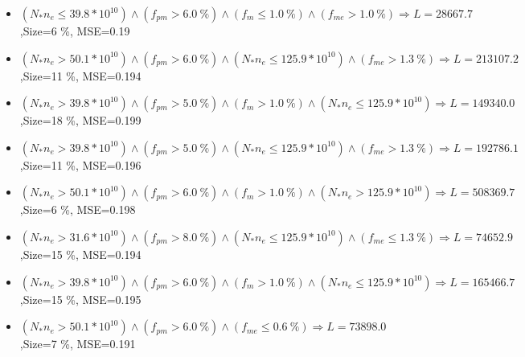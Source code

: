 \documentclass[numbered]{CSL}
\begin{document}
\begin{itemize}
\item $(N_* n_e \leq 39.8 * 10^{10}) \land (f_{pm} > 6.0~\%) \land (f_m \leq 1.0~\%) \land (f_{me} > 1.0~\%) \Rightarrow L = 28667.7$,\hfill Size=6 \%, MSE=0.19
\item $(N_* n_e > 50.1 * 10^{10}) \land (f_{pm} > 6.0~\%) \land (N_* n_e \leq 125.9 * 10^{10}) \land (f_{me} > 1.3~\%) \Rightarrow L = 213107.2$,\hfill Size=11 \%, MSE=0.194
\item $(N_* n_e > 39.8 * 10^{10}) \land (f_{pm} > 5.0~\%) \land (f_m > 1.0~\%) \land (N_* n_e \leq 125.9 * 10^{10}) \Rightarrow L = 149340.0$,\hfill Size=18 \%, MSE=0.199
\item $(N_* n_e > 39.8 * 10^{10}) \land (f_{pm} > 5.0~\%) \land (N_* n_e \leq 125.9 * 10^{10}) \land (f_{me} > 1.3~\%) \Rightarrow L = 192786.1$,\hfill Size=11 \%, MSE=0.196
\item $(N_* n_e > 50.1 * 10^{10}) \land (f_{pm} > 6.0~\%) \land (f_m > 1.0~\%) \land (N_* n_e > 125.9 * 10^{10}) \Rightarrow L = 508369.7$,\hfill Size=6 \%, MSE=0.198
\item $(N_* n_e > 31.6 * 10^{10}) \land (f_{pm} > 8.0~\%) \land (N_* n_e \leq 125.9 * 10^{10}) \land (f_{me} \leq 1.3~\%) \Rightarrow L = 74652.9$,\hfill Size=15 \%, MSE=0.194
\item $(N_* n_e > 39.8 * 10^{10}) \land (f_{pm} > 6.0~\%) \land (f_m > 1.0~\%) \land (N_* n_e \leq 125.9 * 10^{10}) \Rightarrow L = 165466.7$,\hfill Size=15 \%, MSE=0.195
\item $(N_* n_e > 50.1 * 10^{10}) \land (f_{pm} > 6.0~\%) \land (f_{me} \leq 0.6~\%) \Rightarrow L = 73898.0$,\hfill Size=7 \%, MSE=0.191
\end{itemize}
\end{document}
